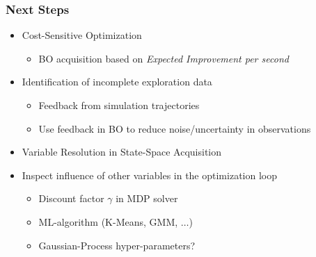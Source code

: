 \begin{frame}
\frametitle{Next Steps}

\begin{itemize}
	\item<1-> Cost-Sensitive Optimization 
	\begin{itemize}
		\item BO acquisition based on \textit{Expected Improvement per second}
	\end{itemize}
	\item<2-> Identification of incomplete exploration data
	\begin{itemize}
		\item Feedback from simulation trajectories
		\item Use feedback in BO to reduce noise/uncertainty in observations
	\end{itemize}
	\item<3-> Variable Resolution in State-Space Acquisition
	\item<4-> Inspect influence of other variables in the optimization loop
	\begin{itemize}
		\item Discount factor $\gamma$ in MDP solver
		\item ML-algorithm (K-Means, GMM, $\ldots$)
		\item Gaussian-Process hyper-parameters?
	\end{itemize}
\end{itemize}
\end{frame}